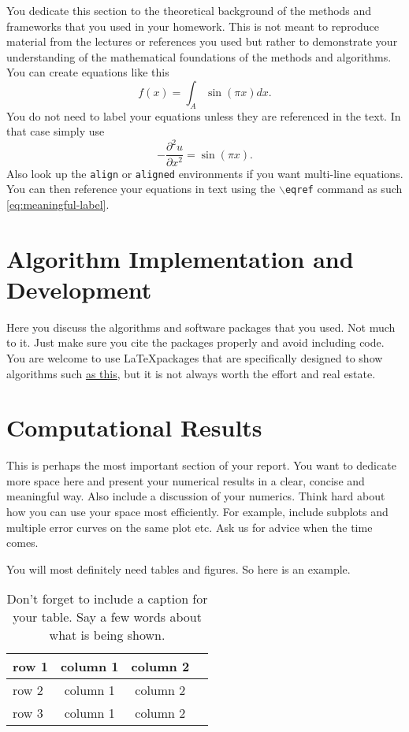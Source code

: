 \documentclass[11pt]{amsart}
\begin{document}
You dedicate this section to the theoretical background of the methods and frameworks 
that you used in your homework. This is not meant to reproduce material from the lectures
 or references you used but rather to demonstrate your understanding of the 
 mathematical foundations of the methods and algorithms. You can create equations like this 
 \begin{equation*}
     f(x) = \int_A \sin( \pi x) dx.
 \end{equation*}
 You do not need to label your equations unless they are referenced in the text. In that 
 case simply use 
 \begin{equation}\label{eq:meaningful-label}
      - \frac{\partial^2 u}{\partial x^2} = \sin ( \pi x).
 \end{equation}
Also look up the \texttt{align} or \texttt{aligned} environments if you want multi-line 
equations. You can then reference your equations in text using the $\backslash$\texttt{eqref}
command as such \eqref{eq:meaningful-label}. 

\section{Algorithm Implementation and Development}\label{sec:algorithms}
Here you discuss the algorithms and software packages that you used. Not much to it. 
Just make sure you cite the packages properly and avoid including code. 
You are welcome to use \LaTeX packages that are specifically designed to show 
algorithms such \href{https://www.overleaf.com/learn/latex/Algorithms}{as this}, but it is 
not always worth the effort and real estate. 


\section{Computational Results}\label{sec:results}

This is perhaps the most important section of your report. You want to dedicate more space 
here and present your numerical results in a clear, concise and meaningful way. Also 
include a discussion of your numerics. Think hard about how you can use 
your space most efficiently. For example, include subplots and multiple error curves on the 
same plot etc. Ask us for advice when the time comes. 

You will most definitely need tables and figures. So here is an example. 

\begin{table}[htp]
    \centering
    \begin{tabular}{| l | c|c | r |}
         \hline
         row 1 & column 1  & column 2  \\ \hline
         row 2 & column 1 & column 2 \\ 
         row 3 & column 1 & column 2 \\ \hline
    \end{tabular}
    \caption{Don't forget to include a caption for your table. Say a few words about what is 
    being shown.}
    \label{tab:meaningful-label}
\end{table}
\end{document}
